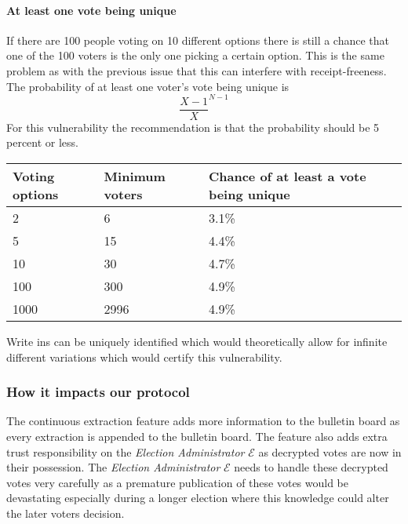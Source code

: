 \paragraph{At least one vote being unique}
If there are 100 people voting on 10 different options there is still a chance that one of the 100 voters is the only one picking a certain option. This is the same problem as with the previous issue that this can interfere with receipt-freeness. 
\noindent The probability of at least one voter's vote being unique is \[ \frac{X-1}{X}^{N-1} \]
For this vulnerability the recommendation is that the probability should be 5 percent or less.
\begin{table}[H]
\begin{tabular}{|l|l|l|}
\hline
Voting options & Minimum voters & Chance of at least a vote being unique \\ \hline
2                   & 6           &  3.1\%                           \\ \hline
5                   & 15          &  4.4\%                         \\ \hline
10                  & 30          &  4.7\%                         \\ \hline
100                 & 300         &  4.9\%                         \\ \hline
1000                & 2996        &  4.9\%                         \\ \hline
\end{tabular}
\end{table}

Write ins can be uniquely identified which would theoretically allow for infinite different variations which would certify this vulnerability.


\subsubsection{How it impacts our protocol}
The continuous extraction feature adds more information to the bulletin board as every extraction is appended to the bulletin board. The feature also adds extra trust responsibility on the \textit{Election Administrator} $\mathcal{E}$ as decrypted votes are now in their possession. The \textit{Election Administrator} $\mathcal{E}$ needs to handle these decrypted votes very carefully as a premature publication of these votes would be devastating especially during a longer election where this knowledge could alter the later voters decision.


